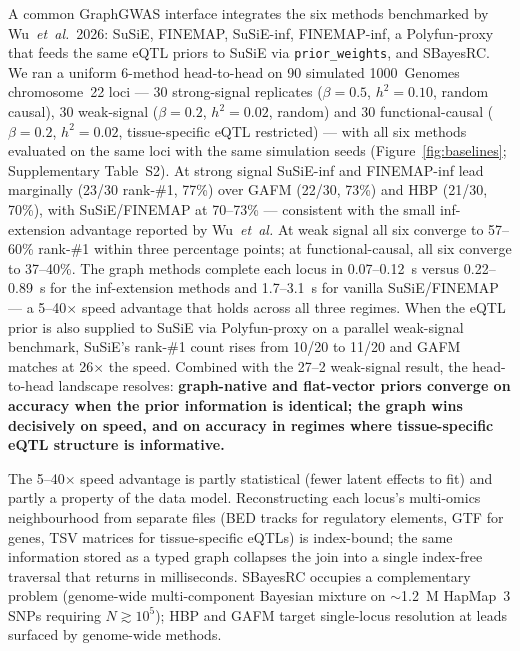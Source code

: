 A common GraphGWAS interface integrates the six methods benchmarked
by Wu~\emph{et~al.}~2026\cite{wu2026genome}: SuSiE\cite{wang2020simple},
FINEMAP\cite{benner2016finemap}, SuSiE-inf\cite{cui2024improving},
FINEMAP-inf\cite{cui2024improving}, a Polyfun-proxy\cite{weissbrod2020polyfun}
that feeds the same eQTL priors to SuSiE via \texttt{prior\_weights},
and SBayesRC\cite{zheng2024leveraging}. We ran a uniform 6-method
head-to-head on 90 simulated 1000~Genomes chromosome~22 loci ---
30 strong-signal replicates ($\beta{=}0.5$, $h^2{=}0.10$, random
causal), 30 weak-signal ($\beta{=}0.2$, $h^2{=}0.02$, random) and 30
functional-causal ($\beta{=}0.2$, $h^2{=}0.02$, tissue-specific eQTL
restricted) --- with all six methods evaluated on the same loci with
the same simulation seeds (Figure~\ref{fig:baselines};
Supplementary Table~S2). At strong signal SuSiE-inf and FINEMAP-inf
lead marginally (23/30 rank-\#1, 77\%) over GAFM (22/30, 73\%) and
HBP (21/30, 70\%), with SuSiE/FINEMAP at 70--73\% --- consistent
with the small inf-extension advantage reported by Wu~\emph{et~al.}
At weak signal all six converge to 57--60\% rank-\#1 within three
percentage points; at functional-causal, all six converge to 37--40\%.
The graph methods complete each locus in 0.07--0.12~s versus
0.22--0.89~s for the inf-extension methods and 1.7--3.1~s for
vanilla SuSiE/FINEMAP --- a 5--40$\times$ speed advantage that holds
across all three regimes. When the eQTL prior is also supplied to
SuSiE via Polyfun-proxy on a parallel weak-signal benchmark, SuSiE's
rank-\#1 count rises from 10/20 to 11/20 and GAFM matches at 26$\times$
the speed. Combined with the 27--2 weak-signal result, the
head-to-head landscape resolves: \textbf{graph-native and flat-vector
priors converge on accuracy when the prior information is identical;
the graph wins decisively on speed, and on accuracy in regimes where
tissue-specific eQTL structure is informative.}

The 5--40$\times$ speed advantage is partly statistical (fewer
latent effects to fit) and partly a property of the data model.
Reconstructing each locus's multi-omics neighbourhood from
separate files (BED tracks for regulatory elements, GTF for genes,
TSV matrices for tissue-specific eQTLs) is index-bound;
the same information stored as a typed graph collapses the join
into a single index-free traversal that returns in milliseconds.
SBayesRC occupies a complementary problem (genome-wide multi-component
Bayesian mixture on $\sim$1.2~M HapMap~3 SNPs requiring $N \gtrsim
10^5$); HBP and GAFM target single-locus resolution at leads surfaced
by genome-wide methods.

